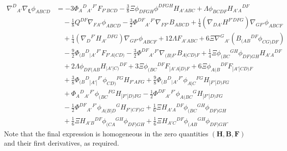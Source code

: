 \documentclass[10pt,a4paper]{article}
\theoremstyle{plain}
\def\bmB{{\bm B}}
\def\bmF{{\bm F}}
\def\bmH{{\bm H}}
\begin{document}
\begin{align}
\nabla^D{}_{A'}\nabla_{\bm\xi}\phi_{ABCD}  &= -3 \Phi _{A}{}^{D}{}_{A'}{}^{F'} F_{F'BCD}  - \tfrac{3}{8} \Xi  \phi _{DFGH} \phi ^{DFGH} H_{A'ABC} + \Lambda  \phi _{BCDF} H_{A'A}{}^{DF} \nonumber\\ 
    & \quad- \tfrac{1}{8} Q^{DF} \nabla_{FA'}\phi _{ABCD}   - \tfrac{3}{2} \Phi ^{DF}{}_{A'}{}^{F'} \nabla_{FF'}B_{ABCD} + \tfrac{1}{4} (\nabla_{DA'}H^{F'DFG}) \nabla_{GF'}\phi _{ABCF} \nonumber\\
    &\quad + \tfrac{1}{4} (\nabla_{D}{}^{F'}H_{A'}{}^{DFG}) \nabla_{GF'}\phi _{ABCF}  + 12 \Lambda  F_{A'ABC} +6\Xi \nabla^G{}_{A'}\left( B_{(AB}{}^{DF}\phi_{CG)DF}\right) \nonumber \\
    &\quad - \tfrac{9}{2} \Phi _{(B}{}^{D}{}_{|A'}{}^{F'}F_{F'A|CD)}  - \tfrac{3}{2} \Phi ^{DF}{}_{A'}{}^{F'}\nabla_{(B|F'}B_{A|CD)F} + \tfrac{1}{4} \Xi  \phi _{(BC}{}^{GH}\phi _{DF)GH} H_{A'A}{}^{DF}  \nonumber\\
    &\quad+ 2 \Lambda  \phi_{DF(AB}H_{\vert A'\vert C)}{}^{DF}+ 3 \Xi  \phi _{(BC}{}^{DF}F_{|A'A|D)F} + 6 \Xi  \phi _{A(B}{}^{DF}F_{|A'|CD)F} \nonumber \\
    &\quad  + \tfrac{3}{8} \Phi _{(B}{}^{D}{}_{|A'|}{}^{F'}\phi _{CD)}{}^{FG}H_{F'AFG} + \tfrac{9}{8} \Phi _{(B}{}^{D}{}_{|A'}{}^{F'}\phi _{A|C}{}^{FG}H_{|F'|D)FG} \nonumber\\
    &\quad + \Phi _{A}{}^{D}{}_{A'}{}^{F'}\phi _{(BC}{}^{FG}H_{|F'|D)FG}  - \tfrac{1}{2} \Phi ^{DF}{}_{A'}{}^{F'}\phi _{A(BC}{}^{G}H_{|F'|D)FG} \nonumber \\
    &\quad  - \tfrac{1}{2} \Phi ^{DF}{}_{A'}{}^{F'}\phi _{A(B|D}{}^{G}H_{F'|CF)G}+ \tfrac{1}{6}\Xi H_{A'A}{}^{DF}\phi_{(BC}{}^{GH}\phi_{DF)GH} \nonumber\\
    &\quad + \tfrac{1}{6}\Xi H_{A'B}{}^{DF}\phi_{(CA}{}^{GH}\phi_{DF)GH} + \tfrac{1}{6}\Xi H_{A'C}{}^{DF}\phi_{(AB}{}^{GH}\phi_{DF)GH}. \label{Eq:CollineationIdentity}
\end{align}
Note that the final expression is homogeneous in the zero quantities
$(\bmH, \bmB,\bmF)$ and their first derivatives, as required.\\
\end{document}
